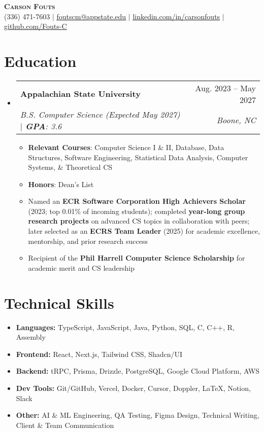 \documentclass[letterpaper,11pt]{article}
\makeatletter
\newcommand{\resumeItem}[1]{
  \item\small{
    {#1 \vspace{-2pt}}
  }
}
\newcommand{\resumeSubheading}[4]{
  \vspace{-2pt}\item
    \begin{tabular*}{0.97\textwidth}[t]{l@{\extracolsep{\fill}}r}
      \textbf{#1} & #2 \\
      \textit{\small#3} & \textit{\small #4} \\
    \end{tabular*}\vspace{-7pt}
}
\newcommand{\resumeSubHeadingListStart}{\begin{itemize}[leftmargin=0.15in, label={}]}
\newcommand{\resumeSubHeadingListEnd}{\end{itemize}}
\newcommand{\resumeItemListStart}{\begin{itemize}}
\newcommand{\resumeItemListEnd}{\end{itemize}\vspace{-5pt}}
\makeatother
\begin{document}
\begin{center}
    \textbf{\Huge \scshape Carson Fouts} \\ \vspace{1pt}
    \small (336) 471-7603 $|$ \href{mailto:foutscm@appstate.edu}{\underline{foutscm@appstate.edu}} $|$ 
    \href{https://linkedin.com/in/carsonfouts}{\underline{linkedin.com/in/carsonfouts}}
    $|$ 
    \href{https://github.com/Fouts-C}{\underline{github.com/Fouts-C}}
\end{center}

\section{Education}
  \resumeSubHeadingListStart
    \resumeSubheading
      {Appalachian State University}{Aug. 2023 -- May 2027}
      {B.S. Computer Science (Expected May 2027) $|$ \textbf{GPA}: 3.6}
      {Boone, NC}
      \resumeItemListStart
        \resumeItem{\textbf{Relevant Courses}: Computer Science I \& II, Database, Data Structures, Software Engineering, Statistical Data Analysis, Computer Systems, \& Theoretical CS}
        \resumeItem{\textbf{Honors}: Dean's List}
        \resumeItem{Named an \textbf{ECR Software Corporation High Achievers Scholar} (2023; top 0.01\% of incoming students); completed \textbf{year-long group research projects} on advanced CS topics in collaboration with peers; later selected as an \textbf{ECRS Team Leader} (2025) for academic excellence, mentorship, and prior research success}
        \resumeItem{Recipient of the \textbf{Phil Harrell Computer Science Scholarship} for academic merit and CS leadership}
      \resumeItemListEnd
  \resumeSubHeadingListEnd

\section{Technical Skills}
\begin{itemize}[leftmargin=0.15in, label={}]
  \item[] \textbf{Languages:} TypeScript, JavaScript, Java, Python, SQL, C, C++, R, Assembly
  \item[] \textbf{Frontend:} React, Next.js, Tailwind CSS, Shadcn/UI
  \item[] \textbf{Backend:} tRPC, Prisma, Drizzle, PostgreSQL, Google Cloud Platform, AWS
  \item[] \textbf{Dev Tools:} Git/GitHub, Vercel, Docker, Cursor, Doppler, LaTeX, Notion, Slack
  \item[] \textbf{Other:} AI \& ML Engineering, QA Testing, Figma Design, Technical Writing, Client \& Team Communication
\end{itemize}
\end{document}
